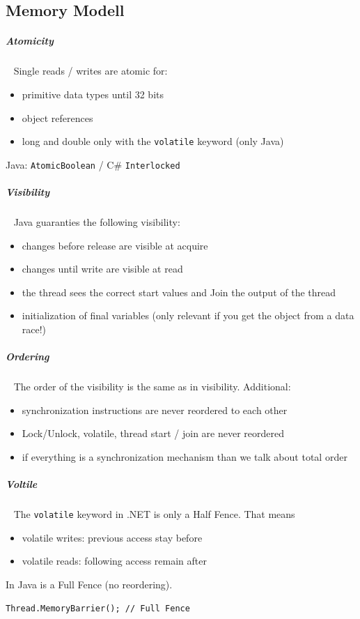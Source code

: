 \documentclass[8pt,twoside,landscape]{extarticle}
\begin{document}
\begin{multicols}{5}
\section{Memory Modell}
\label{sec:org943df64}
\subparagraph{Atomicity} \
\label{sec:org26e810d}
Single reads / writes are atomic for:
\begin{itemize}
\item primitive data types until 32 bits
\item object references
\item long and double only with the \texttt{volatile} keyword (only Java)
\end{itemize}
Java: \texttt{AtomicBoolean} / C\# \texttt{Interlocked}

\subparagraph{Visibility} \
\label{sec:org5a36b6e}
Java guaranties the following visibility:
\begin{itemize}
\item changes before release are visible at acquire
\item changes until write are visible at read
\item the thread sees the correct start values and Join the output of the thread
\item initialization of final variables (only relevant if you get the object from a data race!)
\end{itemize}

\subparagraph{Ordering} \
\label{sec:orgd5d273e}
The order of the visibility is the same as in visibility.
Additional:
\begin{itemize}
\item synchronization instructions are never reordered to each other
\item Lock/Unlock, volatile, thread start / join are never reordered
\item if everything is a synchronization mechanism than we talk about total order
\end{itemize}

\subparagraph{Voltile} \
\label{sec:orge50d5dd}
The \texttt{volatile} keyword in .NET is only a Half Fence.
That means
\begin{itemize}
\item volatile writes: previous access stay before
\item volatile reads: following access remain after
\end{itemize}
In Java is a Full Fence (no reordering).
\lstset{language=csharp,label= ,caption= ,captionpos=b,numbers=none}
\begin{lstlisting}
Thread.MemoryBarrier(); // Full Fence
\end{lstlisting}

\end{multicols}
\end{document}

